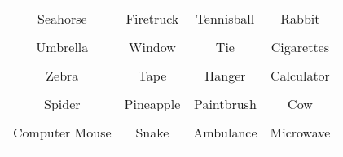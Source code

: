\documentclass[12pt,a4paper]{article}
\begin{document}
\thispagestyle{empty}
\begin{table}[]
\centering
\Huge
\begin{tabular}{cccc}
 Seahorse& Firetruck& Tennisball& Rabbit\\  & & & \\
 Umbrella& Window& Tie& Cigarettes\\  & & & \\
 Zebra& Tape& Hanger& Calculator\\  & & & \\
 Spider& Pineapple& Paintbrush& Cow\\  & & & \\
 Computer Mouse& Snake& Ambulance& Microwave\\  & & & \\
\end{tabular}
\end{table}
\end{document}
